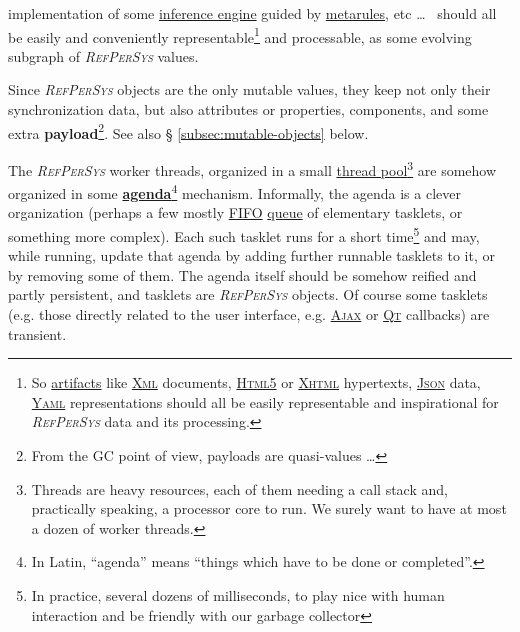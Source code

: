 \documentclass[11pt,a4paper,svgnames]{article}
\newcommand{\RefPerSys}{{\textit{\textsc{RefPerSys}}}}
\begin{document}
implementation of some
\href{https://en.wikipedia.org/wiki/Inference_engine}{inference
  engine} guided by
\href{https://en.wiktionary.org/wiki/metarule}{metarules}, etc \ldots~
should all be easily and conveniently representable\footnote{So
\href{https://en.wikipedia.org/wiki/Artifact_(software_development)}{artifacts}
like \href{https://en.wikipedia.org/wiki/XML}{\textsc{Xml}} documents,
\href{https://en.wikipedia.org/wiki/HTML5}{\textsc{Html5}} or
\href{https://en.wikipedia.org/wiki/XHTML}{\textsc{Xhtml}} hypertexts,
\href{http://json.org/}{\textsc{Json}} data,
\href{https://yaml.org/}{\textsc{Yaml}} representations should all be
easily representable and inspirational for {\RefPerSys} data and its
processing.}  and processable, as some evolving subgraph of
{\RefPerSys} values.

Since {\RefPerSys} objects are the only mutable values, they keep not
only their synchronization data, but also attributes or properties,
components, and some extra 
\textbf{payload}\footnote{From the GC point of view, payloads are
quasi-values  \ldots}. See also \S
  \ref{subsec:mutable-objects} below.

The {\RefPerSys} worker threads, organized in a small
\href{https://en.wikipedia.org/wiki/Thread_pool}{thread
  pool}\footnote{Threads are heavy resources, each of them needing a
call stack and, practically speaking, a processor core to run. We
surely want to have at most a dozen of worker threads.} are somehow
organized in some
\href{https://en.wikipedia.org/wiki/Agenda}{\textbf{agenda}}\footnote{In
Latin, ``agenda'' means ``things which have to be done or
completed''.}  mechanism. Informally, the agenda is a clever
organization (perhaps a few mostly
\href{https://en.wikipedia.org/wiki/FIFO}{FIFO}
\href{https://en.wikipedia.org/wiki/Queue\_(abstract\_data\_type)}{queue}
of elementary tasklets, or something more complex). Each such tasklet
runs for a short time\footnote{In practice, several dozens of
milliseconds, to play nice with human interaction and be friendly with
our garbage collector} and may, while running, update that agenda by
adding further runnable tasklets to it, or by removing some of
them. The agenda itself should be somehow reified and partly
persistent, and tasklets are {\RefPerSys} objects. Of course some
tasklets (e.g. those directly related to the user interface,
e.g. \href{https://en.wikipedia.org/wiki/Ajax_(programming)}{\textsc{Ajax}}
or \href{http://qt.io/}{\textsc{Qt}} callbacks) are transient.

\label{subsec:datalowhigh}
\end{document}
